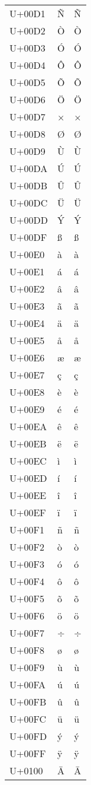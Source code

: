 \documentclass{article}
\begin{document}
\begin{longtable}{lll}
U+00D1 & Ñ & Ñ \\
U+00D2 & Ò & Ò \\
U+00D3 & Ó & Ó \\
U+00D4 & Ô & Ô \\
U+00D5 & Õ & Õ \\
U+00D6 & Ö & Ö \\
U+00D7 & × & × \\
U+00D8 & Ø & Ø \\
U+00D9 & Ù & Ù \\
U+00DA & Ú & Ú \\
U+00DB & Û & Û \\
U+00DC & Ü & Ü \\
U+00DD & Ý & Ý \\
U+00DF & ß & ß \\
U+00E0 & à & à \\
U+00E1 & á & á \\
U+00E2 & â & â \\
U+00E3 & ã & ã \\
U+00E4 & ä & ä \\
U+00E5 & å & å \\
U+00E6 & æ & æ \\
U+00E7 & ç & ç \\
U+00E8 & è & è \\
U+00E9 & é & é \\
U+00EA & ê & ê \\
U+00EB & ë & ë \\
U+00EC & ì & ì \\
U+00ED & í & í \\
U+00EE & î & î \\
U+00EF & ï & ï \\
U+00F1 & ñ & ñ \\
U+00F2 & ò & ò \\
U+00F3 & ó & ó \\
U+00F4 & ô & ô \\
U+00F5 & õ & õ \\
U+00F6 & ö & ö \\
U+00F7 & ÷ & ÷ \\
U+00F8 & ø & ø \\
U+00F9 & ù & ù \\
U+00FA & ú & ú \\
U+00FB & û & û \\
U+00FC & ü & ü \\
U+00FD & ý & ý \\
U+00FF & ÿ & ÿ \\
U+0100 & Ā & Ā \\

\end{longtable}
\end{document}
